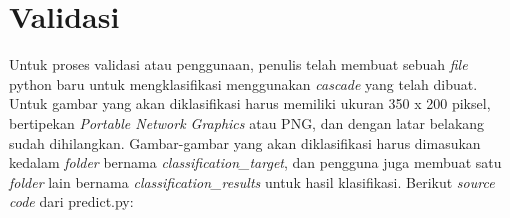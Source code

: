 \section{Validasi}

		Untuk proses validasi atau penggunaan, penulis telah membuat sebuah \textit{file} 
		python baru untuk mengklasifikasi menggunakan \emph{cascade} yang telah dibuat. Untuk gambar 
		yang akan diklasifikasi harus memiliki ukuran 350 x 200 piksel, bertipekan \textit{Portable Network Graphics} 
		atau PNG, dan dengan latar belakang sudah dihilangkan. Gambar-gambar yang akan diklasifikasi harus 
		dimasukan kedalam \textit{folder} bernama \emph{classification\_target}, dan pengguna juga 
		membuat satu \textit{folder} lain bernama \emph{classification\_results} untuk hasil klasifikasi. 
		Berikut \textit{source code} dari predict.py:

